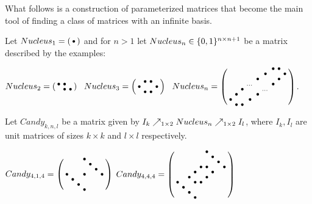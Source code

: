 What follows is a construction of parameterized matrices that become the main tool of finding a class of matrices with an infinite basis.

\begin{defn}
Let $Nucleus_1=\left(\begin{smallmatrix}\bullet\end{smallmatrix}\right)$ and for $n>1$ let $Nucleus_n\in\{0,1\}^{n\times n+1}$ be a matrix described by the examples:
\begin{center}
$Nucleus_2=\smm{\bullet&\bullet& \\ &\bullet&\bullet}\ \ 
Nucleus_3=\smm{ &\bullet&\bullet& \\\bullet& & &\bullet\\ &\bullet&\bullet& }\ \ 
Nucleus_n=\smm{ & & & & & &\bullet&\bullet& \\ & & & & &\bullet& & &\bullet\\ & & & &\bullet& & &\bullet& \\ & & &\dots& & &\bullet& & \\ & &\bullet& & &\dots& & & \\ &\bullet& & &\bullet& & & & \\\bullet& & &\bullet& & & & & \\ &\bullet&\bullet& & & & & & \\}$.
\end{center}
\end{defn}

\begin{defn}
Let $Candy_{k,n,l}$ be a matrix given by $I_k\nearrow_{1\times2}Nucleus_n\nearrow_{1\times2}I_l$, where $I_k,I_l$ are unit matrices of sizes $k\times k$ and $l\times l$ respectively.
\end{defn}
$Candy_{4,1,4}=\left(\begin{smallmatrix}
 & & &\bullet& & & \\
 & & & &\bullet& & \\
 & & & & &\bullet& \\
\bullet& & &\bullet& & &\bullet\\
 &\bullet& & & & & \\
 & &\bullet& & & & \\
 & & &\bullet& & & \end{smallmatrix}\right)$
$Candy_{4,4,4}=\left(\begin{smallmatrix}
 & & & & &\bullet& & & \\
 & & & & & &\bullet& & \\
 & & & & & & &\bullet& \\
 & & & & \bullet&\bullet& & &\bullet\\
 & & &\bullet& & &\bullet& & \\
 & & \bullet& & &\bullet& & & \\
\bullet& & &\bullet&\bullet& & & & \\
 &\bullet& & & & & & & \\
 & &\bullet& & & & & & \\
 & & &\bullet& & & & & \end{smallmatrix}\right)$

